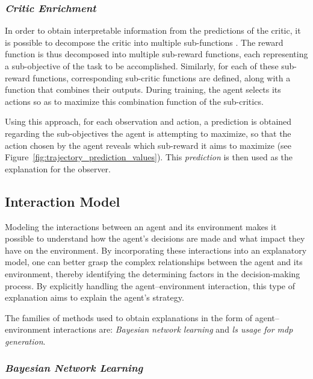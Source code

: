 \subsubsection*{\textit{Critic Enrichment}}
\label{subsubsec:critic_enrichment}

In order to obtain interpretable information from the predictions of the critic, it is possible to decompose the critic into multiple sub-functions \parencite{juozapaitis2019explainable}.
The reward function is thus decomposed into multiple sub-reward functions, each representing a sub-objective of the task to be accomplished.
Similarly, for each of these sub-reward functions, corresponding sub-critic functions are defined, along with a function that combines their outputs.
During training, the agent selects its actions so as to maximize this combination function of the sub-critics.

Using this approach, for each observation and action, a prediction is obtained regarding the sub-objectives the agent is attempting to maximize, so that the action chosen by the agent reveals which sub-reward it aims to maximize (see Figure~\ref{fig:trajectory_prediction_values}).
This \textit{prediction} is then used as the explanation for the observer.



\subsection{Interaction Model}
\label{subsec:interaction_model}

Modeling the interactions between an agent and its environment makes it possible to understand how the agent's decisions are made and what impact they have on the environment.
By incorporating these interactions into an explanatory model, one can better grasp the complex relationships between the agent and its environment, thereby identifying the determining factors in the decision-making process.
By explicitly handling the agent--environment interaction, this type of explanation aims to explain the agent's strategy.

The families of methods used to obtain explanations in the form of agent--environment interactions are: \textit{Bayesian network learning} and \textit{\gls{ls} usage for \gls{mdp} generation}.

\subsubsection{\textit{Bayesian Network Learning}}
\label{subsubsec:bayesian_network_learning}

